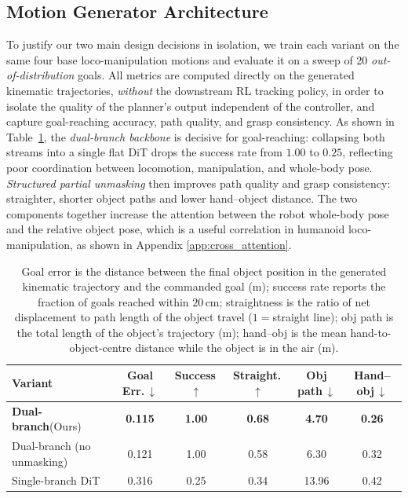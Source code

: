 \documentclass{article}
\begin{document}
\subsection{Motion Generator Architecture}

To justify our two main design decisions in isolation, we train each variant on the same four base loco-manipulation motions and evaluate it on a sweep of 20 \emph{out-of-distribution} goals. All metrics are computed directly on the generated kinematic trajectories, \emph{without} the downstream RL tracking policy, in order to isolate the quality of the planner's output independent of the controller, and capture goal-reaching accuracy, path quality, and grasp consistency. As shown in Table~\ref{tab:ablations}, the \textit{dual-branch backbone} is decisive for goal-reaching: collapsing both streams into a single flat DiT drops the success rate from $1.00$ to $0.25$, reflecting poor coordination between locomotion, manipulation, and whole-body pose. \textit{Structured partial unmasking} then improves path quality and grasp consistency: straighter, shorter object paths and lower hand–object distance. The two components together increase the attention between the robot whole-body pose and the relative object pose, which is a useful correlation in humanoid loco-manipulation, as shown in Appendix \ref{app:cross_attention}.

\begin{table}[h]
\centering
\caption{Goal error is the
distance between the final object position in the generated kinematic trajectory and the
commanded goal (m); success rate reports the fraction of goals reached within $20$\,cm;
straightness is the ratio of net displacement to path length of the object travel
($1{=}$straight line); obj path is the total length of the object's trajectory (m);
hand--obj is the mean hand-to-object-centre distance while the object is in the air (m).}
\label{tab:ablations}
\begin{tabular}{lccccc}
\toprule
Variant & Goal Err.\,$\downarrow$ & Success\,$\uparrow$ & Straight.\,$\uparrow$ & Obj path\,$\downarrow$ & Hand--obj\,$\downarrow$ \\
\midrule
\textbf{Dual-branch}(Ours)        & \textbf{0.115} & \textbf{1.00} & \textbf{0.68} & \textbf{4.70} & \textbf{0.26} \\
Dual-branch (no unmasking)  & 0.121 & 1.00 & 0.58 & 6.30 & 0.32 \\
Single-branch DiT           & 0.316 & 0.25 & 0.34 & 13.96 & 0.42 \\
\bottomrule
\end{tabular}
\end{table}
\end{document}

